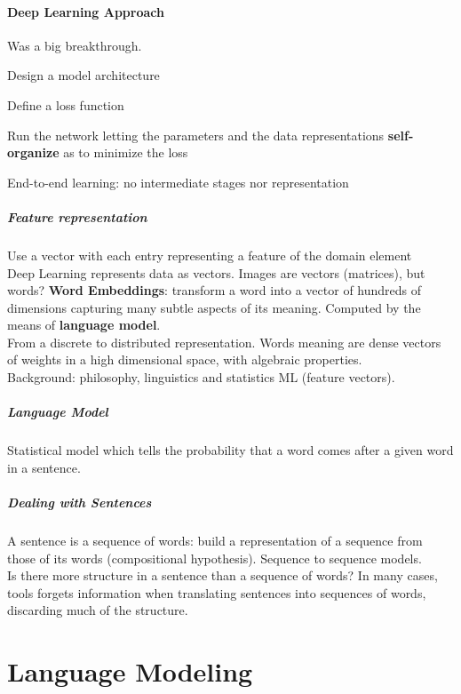 \documentclass[10pt]{report}
\begin{document}
\paragraph{Deep Learning Approach} Was a big breakthrough.\begin{list}{}{}
	\item Design a model architecture
	\item Define a loss function
	\item Run the network letting the parameters and the data representations \textbf{self-organize} as to minimize the loss
	\item End-to-end learning: no intermediate stages nor representation
\end{list}
\subparagraph{Feature representation} Use a vector with each entry representing a feature of the domain element\\
	Deep Learning represents data as vectors. Images are vectors (matrices), but words? \textbf{Word Embeddings}: transform a word into a vector of hundreds of dimensions capturing many subtle aspects of its meaning. Computed by the means of \textbf{language model}.\\
From a discrete to distributed representation. Words meaning are dense vectors of weights in a high dimensional space, with algebraic properties.\\
Background: philosophy, linguistics and statistics ML (feature vectors).
\subparagraph{Language Model} Statistical model which tells the probability that a word comes after a given word in a sentence.
\subparagraph{Dealing with Sentences} A sentence is a sequence of words: build a representation of a sequence from those of its words (compositional hypothesis). Sequence to sequence models.\\
Is there more structure in a sentence than a sequence of words? In many cases, tools forgets information when translating sentences into sequences of words, discarding much of the structure.
\section{Language Modeling}
\end{document}
